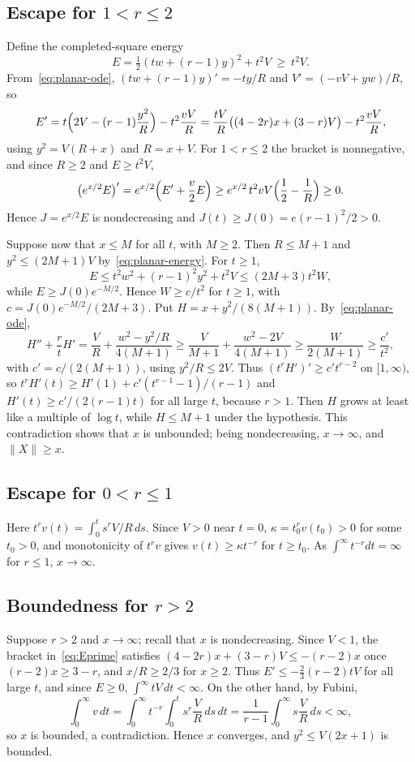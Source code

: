 \documentclass[11pt]{article}
\numberwithin{equation}{section}
\theoremstyle{definition}
\theoremstyle{remark}
\newcommand{\norm}[1]{\lVert #1\rVert}
\begin{document}
\subsection{Escape for \texorpdfstring{$1<r\le2$}{1 < r <= 2}}
Define the completed-square energy
\[
E=\tfrac12(tw+(r-1)y)^2+t^2V\ \ge\ t^2V.
\]
From~\eqref{eq:planar-ode}, $(tw+(r-1)y)'=-ty/R$ and $V'=(-vV+yw)/R$, so
\begin{equation}\label{eq:Eprime}
E'=t\Bigl(2V-(r-1)\frac{y^2}R\Bigr)-t^2\frac{vV}R
 =\frac{tV}{R}\bigl((4-2r)x+(3-r)V\bigr)-t^2\frac{vV}R,
\end{equation}
using $y^2=V(R+x)$ and $R=x+V$. For $1<r\le2$ the bracket is nonnegative, and since $R\ge2$ and $E\ge t^2V$,
\[
\bigl(e^{x/2}E\bigr)'=e^{x/2}\Bigl(E'+\frac v2E\Bigr)\ge e^{x/2}\,t^2vV\Bigl(\frac12-\frac1R\Bigr)\ge0.
\]
Hence $J=e^{x/2}E$ is nondecreasing and $J(t)\ge J(0)=e(r-1)^2/2>0$.

Suppose now that $x\le M$ for all $t$, with $M\ge2$. Then $R\le M+1$ and $y^2\le(2M+1)V$ by~\eqref{eq:planar-energy}. For $t\ge1$,
\[
E\le t^2w^2+(r-1)^2y^2+t^2V\le(2M+3)t^2W,
\]
while $E\ge J(0)e^{-M/2}$. Hence $W\ge c/t^2$ for $t\ge1$, with $c=J(0)e^{-M/2}/(2M+3)$. Put $H=x+y^2/(8(M+1))$. By~\eqref{eq:planar-ode},
\[
H''+\frac rtH'=\frac VR+\frac{w^2-y^2/R}{4(M+1)}\ge\frac V{M+1}+\frac{w^2-2V}{4(M+1)}\ge\frac{W}{2(M+1)}\ge\frac{c'}{t^2},
\]
with $c'=c/(2(M+1))$, using $y^2/R\le2V$. Thus $(t^rH')'\ge c't^{r-2}$ on $[1,\infty)$, so $t^rH'(t)\ge H'(1)+c'(t^{r-1}-1)/(r-1)$ and $H'(t)\ge c'/(2(r-1)t)$ for all large $t$, because $r>1$. Then $H$ grows at least like a multiple of $\log t$, while $H\le M+1$ under the hypothesis. This contradiction shows that $x$ is unbounded; being nondecreasing, $x\to\infty$, and $\norm X\ge x$.

\subsection{Escape for \texorpdfstring{$0<r\le1$}{0 < r <= 1}}
Here $t^rv(t)=\int_0^ts^rV/R\,ds$. Since $V>0$ near $t=0$, $\kappa=t_0^rv(t_0)>0$ for some $t_0>0$, and monotonicity of $t^rv$ gives $v(t)\ge\kappa t^{-r}$ for $t\ge t_0$. As $\int^\infty t^{-r}dt=\infty$ for $r\le1$, $x\to\infty$.

\subsection{Boundedness for \texorpdfstring{$r>2$}{r > 2}}
Suppose $r>2$ and $x\to\infty$; recall that $x$ is nondecreasing. Since $V<1$, the bracket in~\eqref{eq:Eprime} satisfies $(4-2r)x+(3-r)V\le-(r-2)x$ once $(r-2)x\ge3-r$, and $x/R\ge2/3$ for $x\ge2$. Thus $E'\le-\frac23(r-2)tV$ for all large $t$, and since $E\ge0$, $\int^\infty tV\,dt<\infty$. On the other hand, by Fubini,
\[
\int_0^\infty v\,dt=\int_0^\infty t^{-r}\!\int_0^ts^r\frac VR\,ds\,dt=\frac1{r-1}\int_0^\infty s\frac VR\,ds<\infty,
\]
so $x$ is bounded, a contradiction. Hence $x$ converges, and $y^2\le V(2x+1)$ is bounded.
\end{document}
